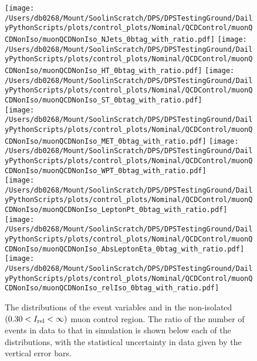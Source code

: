 \begin{figure}[hp]
	\centering
	\texttt{[image: /Users/db0268/Mount/SoolinScratch/DPS/DPSTestingGround/DailyPythonScripts/plots/control\_plots/Nominal/QCDControl/muonQCDNonIso/muonQCDNonIso\_NJets\_0btag\_with\_ratio.pdf]}
	\texttt{[image: /Users/db0268/Mount/SoolinScratch/DPS/DPSTestingGround/DailyPythonScripts/plots/control\_plots/Nominal/QCDControl/muonQCDNonIso/muonQCDNonIso\_HT\_0btag\_with\_ratio.pdf]}
	\texttt{[image: /Users/db0268/Mount/SoolinScratch/DPS/DPSTestingGround/DailyPythonScripts/plots/control\_plots/Nominal/QCDControl/muonQCDNonIso/muonQCDNonIso\_ST\_0btag\_with\_ratio.pdf]} \\
	\texttt{[image: /Users/db0268/Mount/SoolinScratch/DPS/DPSTestingGround/DailyPythonScripts/plots/control\_plots/Nominal/QCDControl/muonQCDNonIso/muonQCDNonIso\_MET\_0btag\_with\_ratio.pdf]}
	\texttt{[image: /Users/db0268/Mount/SoolinScratch/DPS/DPSTestingGround/DailyPythonScripts/plots/control\_plots/Nominal/QCDControl/muonQCDNonIso/muonQCDNonIso\_WPT\_0btag\_with\_ratio.pdf]} \\
	\texttt{[image: /Users/db0268/Mount/SoolinScratch/DPS/DPSTestingGround/DailyPythonScripts/plots/control\_plots/Nominal/QCDControl/muonQCDNonIso/muonQCDNonIso\_LeptonPt\_0btag\_with\_ratio.pdf]} 
	\texttt{[image: /Users/db0268/Mount/SoolinScratch/DPS/DPSTestingGround/DailyPythonScripts/plots/control\_plots/Nominal/QCDControl/muonQCDNonIso/muonQCDNonIso\_AbsLeptonEta\_0btag\_with\_ratio.pdf]}
	\texttt{[image: /Users/db0268/Mount/SoolinScratch/DPS/DPSTestingGround/DailyPythonScripts/plots/control\_plots/Nominal/QCDControl/muonQCDNonIso/muonQCDNonIso\_relIso\_0btag\_with\_ratio.pdf]}
	\caption[The distributions of the event variables and \Irel{} in the non-isolated $(0.30 < \Irel < \infty )$ muon control region. The ratio of the number of events in data to that in simulation is shown below each of the distributions, with the statistical uncertainty in data given by the vertical error bars.]{The distributions of the event variables and \Irel{} in the non-isolated $(0.30 < \Irel < \infty )$ muon control region. The ratio of the number of events in data to that in simulation is shown below each of the distributions, with the statistical uncertainty in data given by the vertical error bars.}
	\label{fig:QCDmuNonIso}
\end{figure}
